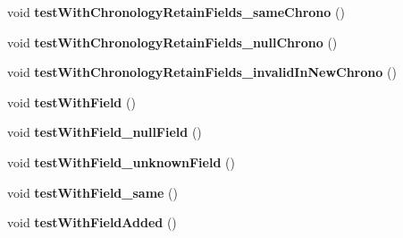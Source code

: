 \begin{DoxyCompactItemize}
\item 
\hypertarget{classorg_1_1joda_1_1time_1_1_test_year_month___basics_a458f29e66671a528a8964bac0251fe42}{void {\bfseries test\-With\-Chronology\-Retain\-Fields\-\_\-same\-Chrono} ()}\label{classorg_1_1joda_1_1time_1_1_test_year_month___basics_a458f29e66671a528a8964bac0251fe42}

\item 
\hypertarget{classorg_1_1joda_1_1time_1_1_test_year_month___basics_a5c6f26d5e0ca60ec2ebd159741bddb70}{void {\bfseries test\-With\-Chronology\-Retain\-Fields\-\_\-null\-Chrono} ()}\label{classorg_1_1joda_1_1time_1_1_test_year_month___basics_a5c6f26d5e0ca60ec2ebd159741bddb70}

\item 
\hypertarget{classorg_1_1joda_1_1time_1_1_test_year_month___basics_a4df63f21f92575e461cff925cf86df33}{void {\bfseries test\-With\-Chronology\-Retain\-Fields\-\_\-invalid\-In\-New\-Chrono} ()}\label{classorg_1_1joda_1_1time_1_1_test_year_month___basics_a4df63f21f92575e461cff925cf86df33}

\item 
\hypertarget{classorg_1_1joda_1_1time_1_1_test_year_month___basics_a2f4469ccc335736ef07199b69787c412}{void {\bfseries test\-With\-Field} ()}\label{classorg_1_1joda_1_1time_1_1_test_year_month___basics_a2f4469ccc335736ef07199b69787c412}

\item 
\hypertarget{classorg_1_1joda_1_1time_1_1_test_year_month___basics_acacad041c223537012256564b02ce079}{void {\bfseries test\-With\-Field\-\_\-null\-Field} ()}\label{classorg_1_1joda_1_1time_1_1_test_year_month___basics_acacad041c223537012256564b02ce079}

\item 
\hypertarget{classorg_1_1joda_1_1time_1_1_test_year_month___basics_ad753b5e7b60d6d9b3392f806dd6d7a35}{void {\bfseries test\-With\-Field\-\_\-unknown\-Field} ()}\label{classorg_1_1joda_1_1time_1_1_test_year_month___basics_ad753b5e7b60d6d9b3392f806dd6d7a35}

\item 
\hypertarget{classorg_1_1joda_1_1time_1_1_test_year_month___basics_aaec86d8c3eb4ce6f92c9c90e271b79c0}{void {\bfseries test\-With\-Field\-\_\-same} ()}\label{classorg_1_1joda_1_1time_1_1_test_year_month___basics_aaec86d8c3eb4ce6f92c9c90e271b79c0}

\item 
\hypertarget{classorg_1_1joda_1_1time_1_1_test_year_month___basics_a7cb3dc0429b687e03777c37228c5b1a8}{void {\bfseries test\-With\-Field\-Added} ()}\label{classorg_1_1joda_1_1time_1_1_test_year_month___basics_a7cb3dc0429b687e03777c37228c5b1a8}


\end{DoxyCompactItemize}
